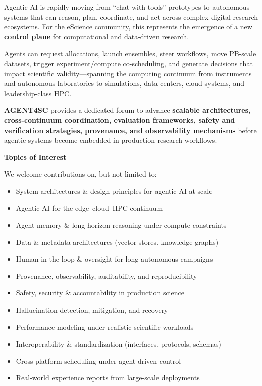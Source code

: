 \documentclass[10pt,a4paper]{article}
\newcommand{\ThinRule}{\noindent{\color{ruleblue}\rule{\linewidth}{0.5pt}}}
\begin{document}
Agentic AI is rapidly moving from ``chat with tools'' prototypes to autonomous
systems that can reason, plan, coordinate, and act across complex digital
research ecosystems. For the eScience community, this represents the emergence
of a new \textbf{control plane} for computational and data-driven research.

Agents can request allocations, launch ensembles, steer workflows, move
PB-scale datasets, trigger experiment/compute co-scheduling, and generate
decisions that impact scientific validity---spanning the computing continuum
from instruments and autonomous laboratories to simulations, data centers,
cloud systems, and leadership-class HPC.

\textbf{AGENT4SC} provides a dedicated forum to advance \textbf{scalable
architectures, cross-continuum coordination, evaluation frameworks, safety and
verification strategies, provenance, and observability mechanisms} before
agentic systems become embedded in production research workflows.

\vspace{10pt}

{\color{navyblue}\large\textbf{Topics of Interest}}
\ThinRule\vspace{4pt}

We welcome contributions on, but not limited to:

\begin{itemize}[leftmargin=16pt, itemsep=1pt, topsep=2pt]
  \item System architectures \& design principles for agentic AI at scale
  \item Agentic AI for the edge--cloud--HPC continuum
  \item Agent memory \& long-horizon reasoning under compute constraints
  \item Data \& metadata architectures (vector stores, knowledge graphs)
  \item Human-in-the-loop \& oversight for long autonomous campaigns
  \item Provenance, observability, auditability, and reproducibility
  \item Safety, security \& accountability in production science
  \item Hallucination detection, mitigation, and recovery
  \item Performance modeling under realistic scientific workloads
  \item Interoperability \& standardization (interfaces, protocols, schemas)
  \item Cross-platform scheduling under agent-driven control
  \item Real-world experience reports from large-scale deployments
\end{itemize}
\end{document}
